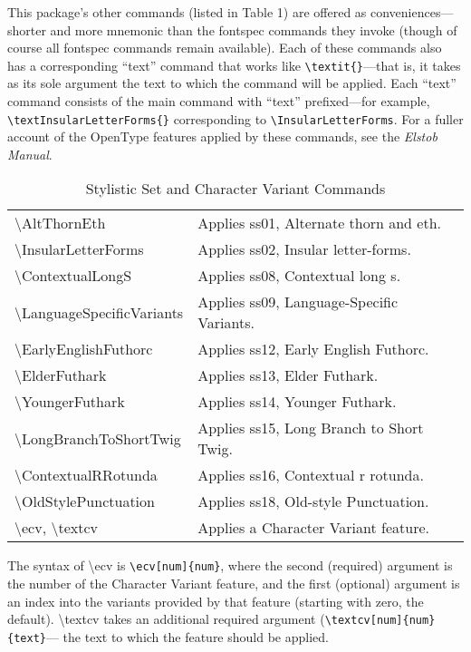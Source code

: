 \documentclass[12pt]{article}
\newcommand{\fspec}{{\sffamily fontspec}}
\newcommand{\bluerow}{\rowcolor{myLightBlue}}
\begin{document}
This package's other commands (listed in Table 1) are offered as conveniences---shorter and more
mnemonic than the {\fspec} commands they invoke (though of course all {\fspec} commands
remain available). Each of these commands
also has a corresponding “text” command that works like 
{\verb|\textit{}|}—that is, it takes
as its sole argument the text to which the command will be applied. Each “text” command
consists of the main command with “text” prefixed—for example,
{\verb|\textInsularLetterForms{}|}
corresponding to {\verb|\InsularLetterForms|}.  For a fuller account of the OpenType features
applied by these commands, see the \textit{Elstob Manual}.

\begin{table}[ht]
    \centering
    \begin{tabular}{| l | p{2.75in} |}
        \hline
    \bluerow\textbackslash AltThornEth & Applies ss01, Alternate thorn and eth.\\
    \textbackslash InsularLetterForms & Applies ss02, Insular letter-forms.\\
    \bluerow\textbackslash ContextualLongS & Applies ss08, Contextual long s.\\
    \textbackslash LanguageSpecificVariants & \small Applies ss09, Language-Specific Variants.\\
    \bluerow\textbackslash EarlyEnglishFuthorc & Applies ss12, Early English Futhorc.\\
    \textbackslash ElderFuthark & Applies ss13, Elder Futhark.\\
    \bluerow\textbackslash YoungerFuthark & Applies ss14, Younger Futhark.\\
    \textbackslash LongBranchToShortTwig & Applies ss15, Long Branch to Short Twig.\\
    \bluerow\textbackslash ContextualRRotunda & Applies ss16, Contextual r rotunda.\\
    \textbackslash OldStylePunctuation & Applies ss18, Old-style Punctuation.\\
    \bluerow\textbackslash ecv, \textbackslash textcv & Applies a Character Variant feature.\\
    \hline
    \end{tabular}
\caption{Stylistic Set and Character Variant Commands}
\end{table}

The syntax of \textbackslash ecv
is {\verb|\ecv[num]{num}|}, where the second (required) argument is the number of the Character Variant feature,
and the first (optional) argument is an index into the variants provided by that feature (starting with zero, the default).
\textbackslash textcv takes an additional required argument ({\verb|\textcv[num]{num}{text}|}— the text to which the
feature should be applied.
\end{document}
